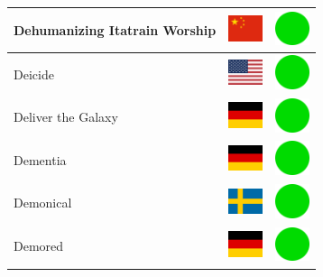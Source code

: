 \documentclass[12pt, a4paper, twoside]{report}
\begin{document}
\begin{center}
\begin{longtable}{|p{5cm}|p{2cm}|p{2cm}|}
 Dehumanizing Itatrain Worship                              & \includegraphics[width=1cm]{../img/flags/cn} &   \includegraphics[width=1cm]{../likes/y} \\ \hline
 Deicide                                                    & \includegraphics[width=1cm]{../img/flags/us} &   \includegraphics[width=1cm]{../likes/y} \\ \hline
 Deliver the Galaxy                                         & \includegraphics[width=1cm]{../img/flags/de} &   \includegraphics[width=1cm]{../likes/y} \\ \hline
 Dementia                                                   & \includegraphics[width=1cm]{../img/flags/de} &   \includegraphics[width=1cm]{../likes/y} \\ \hline
 Demonical                                                  & \includegraphics[width=1cm]{../img/flags/se} &   \includegraphics[width=1cm]{../likes/y} \\ \hline
 Demored                                                    & \includegraphics[width=1cm]{../img/flags/de} &   \includegraphics[width=1cm]{../likes/y} \\ \hline

\end{longtable}
\end{center}
\end{document}
